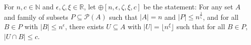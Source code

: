 
        \begin{definition} \label{def:n_large_enough_property}
            For $n, c \in \mathbb{N}$ and $\epsilon, \zeta, \xi \in \mathbb{R}$, let $\oplus[n, \epsilon, \zeta, \xi, c]$ be
            the statement:
            For any set $A$ and family of subsets $P \subseteq \mathcal{P}(A)$ such that $|A| = n$ and $|P| \leq n^{\frac{1}{\zeta}}$,
            and for all $B \in P$ with $|B| \leq n^\epsilon$, there exists $U \subseteq A$ with $|U| = \lfloor n^\xi \rfloor$ such that
            for all $B \in P$, $|U \cap B| \leq c$.
        \end{definition}

